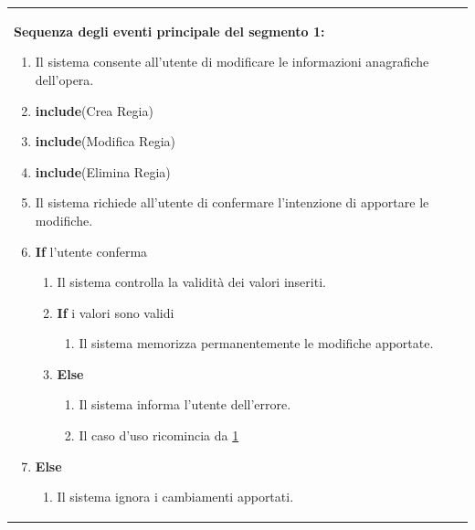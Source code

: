 \documentclass{article}
\begin{document}
\begin{table}[H]
\begin{tabular}{|p{\linewidth}|}
                        \hline
                        \textbf{Sequenza degli eventi principale del segmento 1:}
                        \begin{enumerate}
                            \item Il sistema consente all'utente di modificare le informazioni anagrafiche dell'opera. \label{start_mod_opera}
                            \item \textbf{include}(Crea Regia)
                            \item \textbf{include}(Modifica Regia)
                            \item \textbf{include}(Elimina Regia)
                            \item Il sistema richiede all'utente di confermare l'intenzione di apportare le modifiche.
                            \item \textbf{If} l'utente conferma
                                \begin{enumerate}
                                    \item Il sistema controlla la validità dei valori inseriti.
                                    \item \textbf{If} i valori sono validi 
                                        \begin{enumerate}
                                            \item Il sistema memorizza permanentemente le modifiche apportate.
                                        \end{enumerate}
                                    \item \textbf{Else}
                                        \begin{enumerate}
                                            \item Il sistema informa l'utente dell'errore.
                                            \item Il caso d'uso ricomincia da \ref{start_mod_opera}
                                        \end{enumerate}
                                \end{enumerate}
                            \item \textbf{Else}
                                \begin{enumerate}
                                    \item Il sistema ignora i cambiamenti apportati.
                                \end{enumerate}

\end{enumerate}
\end{tabular}
\end{table}
\end{document}
